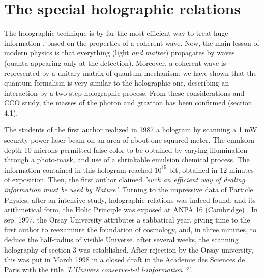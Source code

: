 \documentclass[twoside,draft]{article}
\begin{document}
\begin{sloppypar}
\section{The special holographic relations}

The holographic technique is by far the most efficient way to treat huge information \cite{Grosmann}, based on the
properties of a coherent wave. Now, the main lesson of modern physics is that everything (light \textit{and matter}) propagates by waves (quanta appearing only at the detection). Moreover, a coherent wave is represented by a unitary matrix of quantum mechanism: we have shown that the quantum formalism is very similar to the holographic one, describing an interaction by a two-step holographic process. From these considerations and CCO study, the masses of the photon and graviton has been confirmed (section 4.1).

The students of the first author realized in 1987 a hologram by scanning a 1 mW security power laser beam on an area of about one squared meter. The emulsion depth 10 microns permitted false color to be obtained by varying illumination through a photo-mask, and use of a shrinkable emulsion chemical process. The information contained in this hologram reached $10^15$ bit,  obtained in 12 minutes of exposition. Then, the first author claimed \textit{'such an efficient way of dealing information must be used by Nature'}. Turning to the impressive data of Particle Physics, after an intensive study, holographic relations was indeed found, and its arithmetical form, the Holic Principle was exposed at ANPA 16 (Cambridge) \cite{Sanchez4}. In sep. 1997, the Orsay University attributes a sabbatical year, giving time to the first author to reexaminre the foundation of cosmology, and, in three minutes, to deduce the half-radius of visible Universe. after several weeks, the scanning holography of section 3 was established. After rejection by the Orsay university, this was put in March 1998 in a closed draft in the Academie des  Sciences de Paris with the title \textit{ 'L'Univers conserve-t-il l-information ?'}.


\end{sloppypar}
\end{document}
